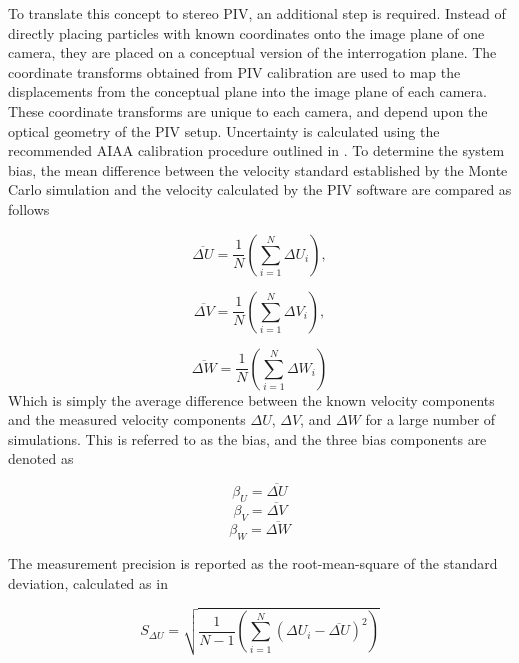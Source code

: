 To translate this concept to stereo PIV, an additional step is required. 
Instead of directly placing particles with known coordinates onto the image 
plane of one camera, they are placed on a conceptual version of the 
interrogation plane. The coordinate transforms obtained from PIV calibration 
are used to map the displacements from the conceptual plane into the image 
plane of each camera. These coordinate transforms are unique to each camera, 
and depend upon the optical geometry of the PIV setup. Uncertainty is 
calculated using the recommended AIAA calibration procedure outlined in 
\cite{PIVuncertAIAA}. To determine the system bias, the mean difference between 
the velocity standard established by the Monte Carlo simulation and the 
velocity calculated by the PIV software are compared as follows

\begin{equation}
\overline{\Delta U} = \frac{1}{N} \left(\sum_{i=1}^N \Delta U_i \right),
\label{eq:Uerror}
\end{equation}

\begin{equation}
\overline{\Delta V} = \frac{1}{N} \left(\sum_{i=1}^N \Delta V_i \right),
\label{eq:Verror}
\end{equation}

\begin{equation}
\overline{\Delta W} = \frac{1}{N} \left(\sum_{i=1}^N \Delta W_i \right)
\label{eq:Werror}
\end{equation}
%
Which is simply the average difference between the known velocity components 
and the measured velocity components $\Delta U$, $\Delta V$, and $\Delta W$ for 
a large number of simulations. This is referred to as the bias, and the three 
bias components are denoted as

\begin{equation}
\beta_{U} = \overline{\Delta U}
\label{eq:Ubias}
\end{equation}
\begin{equation}
\beta_{V} = \overline{\Delta V}
\label{eq:Vbias}
\end{equation}
\begin{equation}
\beta_{W} = \overline{\Delta W}
\label{eq:Wbias}
\end{equation}

The measurement precision is reported as the root-mean-square of the  
standard deviation, calculated as in 
	
\begin{equation}
S_{\Delta U} = \sqrt{\frac{1}{N-1} \left(\sum_{i=1}^N (\Delta U_i - 
\overline{\Delta U})^2 \right)}
\label{eq:Usd}
\end{equation}

